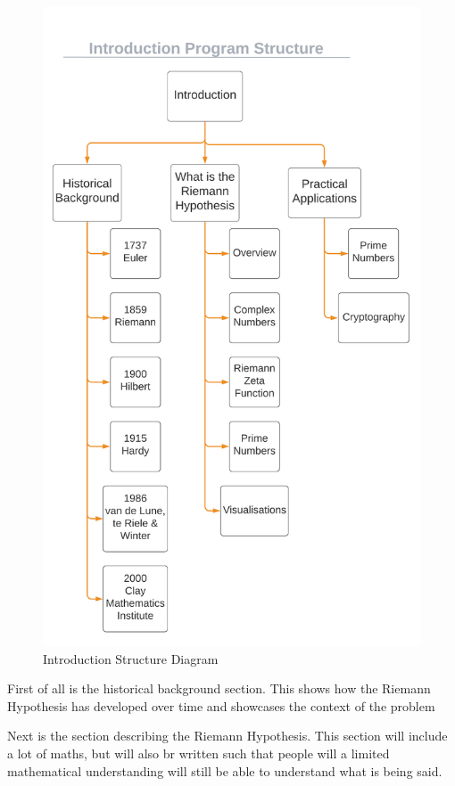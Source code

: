 \documentclass{article}
\begin{document}
\begin{figure}[h]
    \centering
    \captionsetup{justification=centering}
    \includegraphics[scale=0.385]{introduction-structure-diagram}
    \caption{Introduction Structure Diagram}
\end{figure}

First of all is the historical background section. This shows how the Riemann Hypothesis has developed over time and showcases the context of the problem

Next is the section describing the Riemann Hypothesis. This section will include a lot of maths, but will also br written such that people will a limited mathematical understanding will still be able to understand what is being said.
\end{document}
